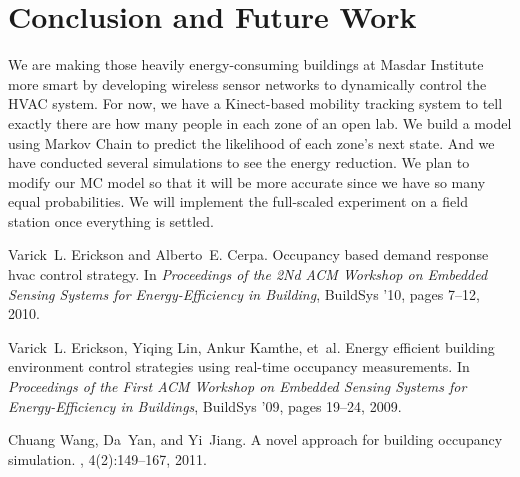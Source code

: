 \documentclass{sig-alternate}
\begin{document}





\section{Conclusion and Future Work}
\label{sec:concl-future-work}
We are making those heavily energy-consuming buildings at Masdar
Institute more smart by developing wireless sensor networks to
dynamically control the HVAC system. For now, we have a Kinect-based
mobility tracking system to tell exactly there are how many people in
each zone of an open lab. We build a model using Markov Chain to
predict the likelihood of each zone's next state. And we have
conducted several simulations to see the energy reduction. We plan to
modify our MC model so that it will be more accurate since we have so
many equal probabilities. We will implement the full-scaled experiment
on a field station once everything is settled. 









% 
% 
{\scriptsize
\begin{thebibliography}{1}

Varick~L. Erickson and Alberto~E. Cerpa.
\newblock Occupancy based demand response hvac control strategy.
\newblock In {\em Proceedings of the 2Nd ACM Workshop on Embedded Sensing
  Systems for Energy-Efficiency in Building}, BuildSys '10, pages 7--12, 2010.

Varick~L. Erickson, Yiqing Lin, Ankur Kamthe, et~al.
\newblock Energy efficient building environment control strategies using
  real-time occupancy measurements.
\newblock In {\em Proceedings of the First ACM Workshop on Embedded Sensing
  Systems for Energy-Efficiency in Buildings}, BuildSys '09, pages 19--24,
  2009.

Chuang Wang, Da~Yan, and Yi~Jiang.
\newblock A novel approach for building occupancy simulation.
, 4(2):149--167, 2011.

\end{thebibliography}

}

\balancecolumns
\end{document}
